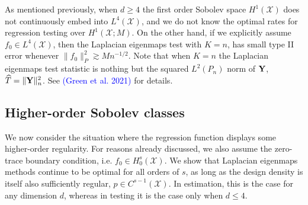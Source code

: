 \documentclass{article}
\newcommand{\1}{\mathbf{1}}
\newcommand{\Leb}{L}
\newcommand{\mc}[1]{\mathcal{#1}}
\newcommand{\wh}[1]{\widehat{#1}}
\theoremstyle{alden}
\theoremstyle{aldenthm}
\theoremstyle{definition}
\theoremstyle{remark}
\begin{document}
As mentioned previously, when $d \geq 4$ the first order Sobolev space $H^1(\mc{X})$ does not continuously embed into $\Leb^4(\mc{X})$, and we do not know the optimal rates for regression testing over $H^1(\mc{X};M)$. On the other hand, if we explicitly assume $f_0 \in \Leb^4(\mc{X})$, then the Laplacian eigenmaps test with $K = n$, has small type II error whenever $\|f_0\|_P^2 \gtrsim Mn^{-1/2}$. Note that when $K = n$ the Laplacian eigenmaps test statistic is nothing but the squared $L^2(P_n)$ norm of ${\bf Y}$, $\wh{T} = \|{\bf Y}\|_n^2$. See \textcolor{blue}{(Green et al. 2021)} for details.

\subsection{Higher-order Sobolev classes}
\label{sec:higher_order_sobolev_classes}
We now consider the situation where the regression function displays some higher-order regularity. For reasons already discussed, we also assume the zero-trace boundary condition, i.e. $f_0 \in H_0^s(\mc{X})$. We show that Laplacian eigenmaps methods continue to be optimal for all orders of $s$, as long as the design density is itself also sufficiently regular, $p \in C^{s - 1}(\mc{X})$. In estimation, this is the case for any dimension $d$, whereas in testing it is the case only when $d \leq 4$. 
\end{document}

